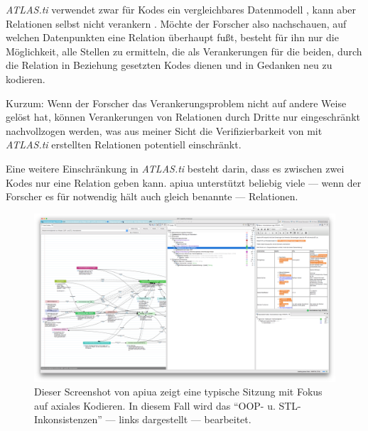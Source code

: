 \textit{ATLAS.ti} verwendet zwar für Kodes ein vergleichbares Datenmodell \citep{MuhlmeyerMentzel:2011vs}, kann aber Relationen selbst nicht verankern \citep{Zieris:yCXyxVc9}. Möchte der Forscher also nachschauen, auf welchen Datenpunkten eine Relation überhaupt fußt, besteht für ihn nur die Möglichkeit, alle Stellen zu ermitteln, die als Verankerungen für die beiden, durch die Relation in Beziehung gesetzten Kodes dienen und in Gedanken neu zu kodieren.

Kurzum: Wenn der Forscher das Verankerungsproblem nicht auf andere Weise gelöst hat, können Verankerungen von Relationen durch Dritte nur eingeschränkt nachvollzogen werden, was aus meiner Sicht die Verifizierbarkeit von mit \textit{ATLAS.ti} erstellten Relationen potentiell einschränkt.

Eine weitere Einschränkung in \textit{ATLAS.ti} besteht darin, dass es zwischen zwei Kodes nur eine Relation geben kann. \gls{apiua} unterstützt beliebig viele --- wenn der Forscher es für notwendig hält auch gleich benannte --- Relationen.

\begin{figure}
  \centering
    \includegraphics[width=1.0\linewidth]{Figures/apiua/axialcoding.png}
  \caption[APIUA: Axiales Kodieren ]{Dieser Screenshot von \gls{apiua} zeigt eine typische Sitzung mit Fokus auf axiales Kodieren. In diesem Fall wird das  ``OOP- u. STL-Inkonsistenzen'' --- links dargestellt --- bearbeitet.}
  \label{fig:apiua-axialcoding}
\end{figure}

